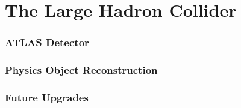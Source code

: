 \part {\LARGE{The Large Hadron Collider}}
\label{sec:LHC}

\section{ATLAS Detector}
\label{sec:ATLAS}


\section{ Physics Object Reconstruction} 
\label{sec:ParticleReconstruction}


\section{Future Upgrades}
\label{sec:FutureUpgrades}

